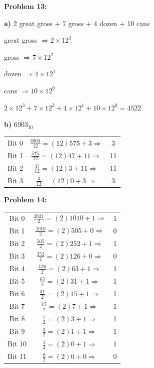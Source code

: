 \documentclass{article}
\begin{document}
    \textbf{Problem 13:}

    \quad\textbf{a)} 2 great gross + 7 gross + 4 dozen + 10 cans

    \quad{} great gross $\Rightarrow 2 \times 12^3$ 

    \quad{} gross $\Rightarrow 7 \times 12^2$ 

    \quad{} dozen $\Rightarrow 4 \times 12^1$ 

    \quad{} cans $\Rightarrow 10 \times 12^0$ 

    \quad\quad $2\times 12^3 + 7 \times 12^2 + 4 \times 12^1 + 10 \times 12^0=\boxed{4522}$

    \quad\textbf{b)} $6903_{10}$

    \begin{center}
        \begin{tabular}{ c|c c }
            Bit 0 & $\frac{6903}{12} = (12)575 + 3 \Rightarrow$ & 3 \\
            Bit 1 & $\frac{575}{12} = (12)47 + 11 \Rightarrow$ & 11 \\
            Bit 2 & $\frac{47}{12} = (12)3 + 11 \Rightarrow$ & 11 \\
            Bit 3 & $\frac{3}{12} = (12)0 + 3 \Rightarrow$ & 3 \\
        \end{tabular}
    \end{center}

    \quad\quad
    \noindent{}

    \textbf{Problem 14:}

    \begin{center}
        \begin{tabular}{ c|c c }
            Bit 0 & $\frac{2021}{2} = (2)1010 + 1 \Rightarrow$ & 1 \\
            Bit 1 & $\frac{1010}{2} = (2)505 + 0 \Rightarrow$ & 0 \\
            Bit 2 & $\frac{505}{2} = (2)252 + 1 \Rightarrow$ & 1 \\
            Bit 3 & $\frac{252}{2} = (2)126 + 0 \Rightarrow$ & 0 \\
            Bit 4 & $\frac{126}{2} = (2)63 + 1 \Rightarrow$ & 1 \\
            Bit 5 & $\frac{63}{2} = (2)31 + 1 \Rightarrow$ & 1 \\
            Bit 6 & $\frac{31}{2} = (2)15 + 1 \Rightarrow$ & 1 \\
            Bit 7 & $\frac{15}{2} = (2)7 + 1 \Rightarrow$ & 1 \\
            Bit 8 & $\frac{7}{2} = (2)3 + 1 \Rightarrow$ & 1 \\
            Bit 9 & $\frac{3}{2} = (2)1 + 1 \Rightarrow$ & 1 \\
            Bit 10 & $\frac{1}{2} = (2)0 + 1 \Rightarrow$ & 1 \\
            Bit 11 & $\frac{0}{2} = (2)0 + 0 \Rightarrow$ & 0
        \end{tabular}
    \end{center}
\end{document}
